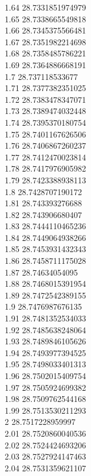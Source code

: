{1.64	28.7331851974979\\
1.65	28.7338665549818\\
1.66	28.7345375566481\\
1.67	28.7351982214698\\
1.68	28.7358485786221\\
1.69	28.7364886668191\\
1.7	28.737118533677\\
1.71	28.7377382351025\\
1.72	28.7383478347071\\
1.73	28.7389474032448\\
1.74	28.7395370180754\\
1.75	28.7401167626506\\
1.76	28.7406867260237\\
1.77	28.7412470023814\\
1.78	28.7417976905982\\
1.79	28.7423388938113\\
1.8	28.7428707190172\\
1.81	28.743393276688\\
1.82	28.743906680407\\
1.83	28.7444110465236\\
1.84	28.7449064938266\\
1.85	28.7453931432343\\
1.86	28.7458711175028\\
1.87	28.74634054095\\
1.88	28.7468015391954\\
1.89	28.7472542389155\\
1.9	28.7476987676135\\
1.91	28.7481352534033\\
1.92	28.7485638248064\\
1.93	28.7489846105626\\
1.94	28.7493977394525\\
1.95	28.7498033401313\\
1.96	28.7502015409754\\
1.97	28.7505924699382\\
1.98	28.7509762544168\\
1.99	28.7513530211293\\
2	28.7517228959997\\
2.01	28.7520860040536\\
2.02	28.7524424693206\\
2.03	28.7527924147463\\
2.04	28.7531359621107\\
}
